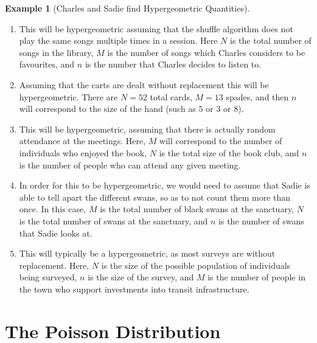 \documentclass[
  letterpaper,
  DIV=11,
  numbers=noendperiod]{scrreprt}
\providecommand{\tightlist}{%
  \setlength{\itemsep}{0pt}\setlength{\parskip}{0pt}}\usepackage{longtable,booktabs,array}
\theoremstyle{definition}
\theoremstyle{definition}
\newtheorem{example}{Example}[chapter]
\theoremstyle{definition}
\theoremstyle{remark}
\begin{document}
\begin{example}[Charles and Sadie find Hypergeometric
Quantities]
\begin{tcolorbox}[enhanced jigsaw, colback=white, colframe=quarto-callout-color-frame, arc=.35mm, leftrule=.75mm, rightrule=.15mm, opacityback=0, breakable, bottomrule=.15mm, left=2mm, toprule=.15mm]
\begin{enumerate}
\def\labelenumi{\alph{enumi}.}
\tightlist
\item
  This will be hypergeometric assuming that the shuffle algorithm does
  not play the same songs multiple times in a session. Here \(N\) is the
  total number of songs in the library, \(M\) is the number of songs
  which Charles considers to be favourites, and \(n\) is the number that
  Charles decides to listen to.
\item
  Assuming that the carts are dealt without replacement this will be
  hypergeometric. There are \(N=52\) total cards, \(M=13\) spades, and
  then \(n\) will correspond to the size of the hand (such as \(5\) or
  \(3\) or \(8\)).
\item
  This will be hypergeometric, assuming that there is actually random
  attendance at the meetings. Here, \(M\) will correspond to the number
  of individuals who enjoyed the book, \(N\) is the total size of the
  book club, and \(n\) is the number of people who can attend any given
  meeting.
\item
  In order for this to be hypergeometric, we would need to assume that
  Sadie is able to tell apart the different swans, so as to not count
  them more than once. In this case, \(M\) is the total number of black
  swans at the sanctuary, \(N\) is the total number of swans at the
  sanctuary, and \(n\) is the number of swans that Sadie looks at.
\item
  This will typically be a hypergeometric, as most surveys are without
  replacement. Here, \(N\) is the size of the possible population of
  individuals being surveyed, \(n\) is the size of the survey, and \(M\)
  is the number of people in the town who support investments into
  transit infrastructure.
\end{enumerate}

\end{tcolorbox}

\end{example}

\section{The Poisson Distribution}\label{the-poisson-distribution}
\end{document}

